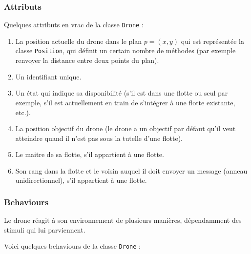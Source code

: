 \documentclass[11pt]{report}
\begin{document}
\subsubsection{Attributs}

Quelques attributs en vrac de la classe \verb|Drone| :

\begin{enumerate}
\item La position actuelle du drone dans le plan $p = (x, y)$ qui est représentée la classe \verb|Position|, qui définit un certain nombre de méthodes (par exemple renvoyer la distance entre deux points du plan).

\item Un identifiant unique.

\item Un état qui indique sa disponibilité (s'il est dans une flotte ou seul par exemple, s'il est actuellement en train de s'intégrer à une flotte existante, etc.).

\item La position objectif du drone (le drone a un objectif par défaut qu'il veut atteindre quand il n'est pas sous la tutelle d'une flotte).

\item Le maitre de sa flotte, s'il appartient à une flotte.

\item Son rang dans la flotte et le voisin auquel il doit envoyer un message (anneau unidirectionnel), s'il appartient à une flotte.
\end{enumerate}

\subsubsection{Behaviours} 

Le drone réagit à son environnement de plusieurs manières, dépendamment des stimuli qui lui parviennent. 

Voici quelques behaviours de la classe \verb|Drone| :
\end{document}
